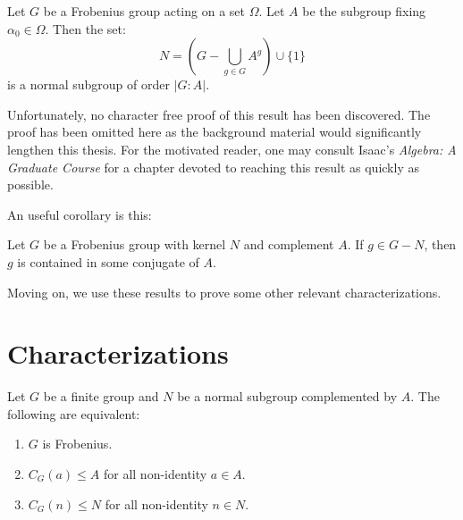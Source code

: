 \documentclass[main.tex]{subfiles}
\begin{document}
\begin{theorem}[Frobenius]
Let $G$ be a Frobenius group acting on a set $\Omega$. Let $A$ be the subgroup fixing $\alpha_0 \in \Omega$. Then the set:
$$N = (G - \bigcup_{g \in G} A^g) \cup \{1\}$$
is a normal subgroup of order $|G : A|$.
\end{theorem}

Unfortunately, no character free proof of this result has been discovered. The proof has been omitted here as the background material would significantly lengthen this thesis. For the motivated reader, one may consult Isaac's \emph{Algebra: A Graduate Course} \cite{isaacsalgebra} for a chapter devoted to reaching this result as quickly as possible.

An useful corollary is this:

\begin{corollary}\label{frobeniuscorollary}
Let $G$ be a Frobenius group with kernel $N$ and complement $A$. If $g \in G - N$, then $g$ is contained in some conjugate of $A$.
\end{corollary}

Moving on, we use these results to prove some other relevant characterizations.

\hss

\section{Characterizations}

\hss

\begin{lemma}\label{frobeniuscentralizers}
Let $G$ be a finite group and $N$ be a normal subgroup complemented by $A$. The following are equivalent:
\begin{enumerate}
	\item $G$ is Frobenius.
	\item $C_G(a) \le A$ for all non-identity $a \in A$.
	\item $C_G(n) \le N$ for all non-identity $n \in N$.
\end{enumerate}
\end{lemma}
\end{document}
